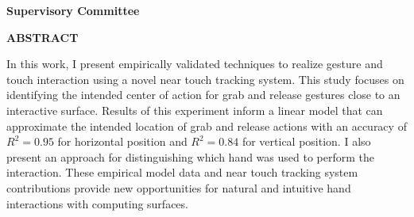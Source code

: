 \newpage
{}

\noindent \textbf{Supervisory Committee}
\tpbreak
\panel

\begin{center}
\textbf{ABSTRACT}
\end{center}

In this work, I present empirically validated techniques to realize gesture and touch interaction using a novel near touch tracking system.
This study focuses on identifying the intended center of action for grab and release gestures close to an interactive surface.  
Results of this experiment inform a linear model that can approximate the intended location of grab and release actions with an accuracy of $R^2=0.95$ for horizontal position and $R^2=0.84$ for vertical position. 
I also present an approach for distinguishing which hand was used to perform the interaction. 
These empirical model data and near touch tracking system contributions provide new opportunities for natural and intuitive hand interactions with computing surfaces.
